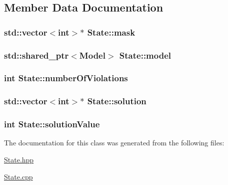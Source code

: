 \subsection{Member Data Documentation}
\hypertarget{class_state_af719cb2cc33bb43091fd40ee0d6b5bf9}{
\subsubsection[{mask}]{\setlength{\rightskip}{0pt plus 5cm}std\-::vector$<$int$>$$\ast$ State\-::mask\hspace{0.3cm}{\ttfamily [private]}}}\label{class_state_af719cb2cc33bb43091fd40ee0d6b5bf9}
\hypertarget{class_state_a186c5e2023a2fe5f0587c77e55f122a9}{
\subsubsection[{model}]{\setlength{\rightskip}{0pt plus 5cm}std\-::shared\-\_\-ptr$<${\bf Model}$>$ State\-::model\hspace{0.3cm}{\ttfamily [private]}}}\label{class_state_a186c5e2023a2fe5f0587c77e55f122a9}
\hypertarget{class_state_a1486bf81e466cab8d70d3b550cd4e0f9}{
\subsubsection[{number\-Of\-Violations}]{\setlength{\rightskip}{0pt plus 5cm}int State\-::number\-Of\-Violations}}\label{class_state_a1486bf81e466cab8d70d3b550cd4e0f9}
\hypertarget{class_state_aa37c4277fe2f3be05931b7a5b8443401}{
\subsubsection[{solution}]{\setlength{\rightskip}{0pt plus 5cm}std\-::vector$<$int$>$$\ast$ State\-::solution\hspace{0.3cm}{\ttfamily [private]}}}\label{class_state_aa37c4277fe2f3be05931b7a5b8443401}
\hypertarget{class_state_a1cd5b1a0b71c43d2da0dfff6147f245c}{
\subsubsection[{solution\-Value}]{\setlength{\rightskip}{0pt plus 5cm}int State\-::solution\-Value\hspace{0.3cm}{\ttfamily [private]}}}\label{class_state_a1cd5b1a0b71c43d2da0dfff6147f245c}


The documentation for this class was generated from the following files\-:\begin{DoxyCompactItemize}
\item 
\hyperlink{_state_8hpp}{State.\-hpp}\item 
\hyperlink{_state_8cpp}{State.\-cpp}\end{DoxyCompactItemize}
